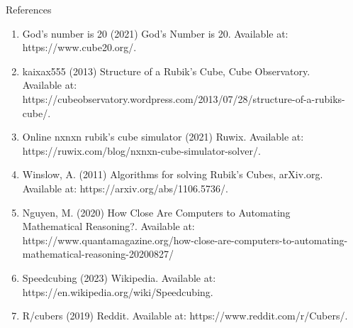 \documentclass[final]{beamer}
\newlength{\sepwidth}
\newlength{\colwidth}
\newcommand{\separatorcolumn}{\begin{column}{\sepwidth}\end{column}}
\begin{document}
\begin{frame}[t]
\begin{columns}[t]
\begin{column}{\colwidth}
\begin{block}{References}
    \nocite{*}
    \footnotesize{}
    \begin{enumerate}
    \item God’s number is 20 (2021) God’s Number is 20. Available at: https://www.cube20.org/.\\[0.1cm]
    \item kaixax555 (2013) Structure of a Rubik’s Cube, Cube Observatory. Available at: https://cubeobservatory.wordpress.com/2013/07/28/structure-of-a-rubiks-cube/.  \\[0.1cm]
    \item Online nxnxn rubik’s cube simulator (2021) Ruwix. Available at: https://ruwix.com/blog/nxnxn-cube-simulator-solver/.  \\[0.1cm]
    \item Winslow, A. (2011) Algorithms for solving Rubik’s Cubes, arXiv.org. Available at: https://arxiv.org/abs/1106.5736/.  \\[0.1cm]
    \item Nguyen, M. (2020) How Close Are Computers to Automating Mathematical Reasoning?. Available at: https://www.quantamagazine.org/how-close-are-computers-to-automating-mathematical-reasoning-20200827/ \\[0.1cm]
    \item Speedcubing (2023) Wikipedia. Available at: https://en.wikipedia.org/wiki/Speedcubing. \\[0.1cm] 
    \item R/cubers (2019) Reddit. Available at: https://www.reddit.com/r/Cubers/. 
    \end{enumerate}
  \end{block}

\end{column}

\separatorcolumn
\end{columns}
\end{frame}
\end{document}
